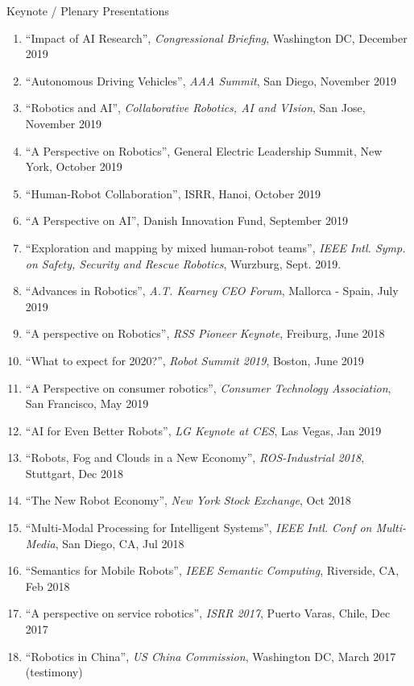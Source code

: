 \documentclass{article}
\begin{document}
\begin{cv}
\begin{cvlist}{Keynote / Plenary Presentations}
\item
  \begin{enumerate}
  \item ``Impact of AI Research'', {\em Congressional Briefing}, Washington DC, December 2019
  \item ``Autonomous Driving Vehicles'', {\em AAA Summit}, San Diego, November 2019
  \item ``Robotics and AI'', {\em Collaborative Robotics, AI and VIsion}, San Jose, November 2019
  \item ``A Perspective on Robotics'', General Electric Leadership Summit, New York, October 2019
  \item ``Human-Robot Collaboration'', ISRR, Hanoi, October 2019
  \item ``A Perspective on AI'', Danish Innovation Fund, September 2019
  \item ``Exploration and mapping by mixed human-robot teams'', {\em IEEE Intl. Symp. on Safety, Security and Rescue Robotics},
      Wurzburg, Sept. 2019. 
  \item  ``Advances in Robotics'', {\em A.T. Kearney CEO Forum}, Mallorca - Spain, July 2019
  \item ``A perspective on Robotics'', {\em RSS Pioneer Keynote}, Freiburg, June 2018
  \item ``What to expect for 2020?'', {\em Robot Summit 2019}, Boston, June 2019
  \item ``A Perspective on consumer robotics'', {\em Consumer Technology Association}, San Francisco, May 2019
  \item ``AI for Even Better Robots'', {\em LG Keynote at CES}, Las Vegas, Jan 2019
  \item ``Robots, Fog and Clouds in a New Economy'', {\em ROS-Industrial 2018}, Stuttgart, Dec 2018
  \item ``The New Robot Economy'', {\em New York Stock Exchange}, Oct 2018
  \item ``Multi-Modal Processing for Intelligent Systems'', {\em IEEE Intl. Conf on Multi-Media}, San Diego, CA, Jul 2018
  \item ``Semantics for Mobile Robots'', {\em IEEE Semantic Computing}, Riverside, CA, Feb 2018
  \item ``A perspective on service robotics'', {\em ISRR 2017}, Puerto Varas, Chile, Dec 2017
  \item ``Robotics in China'', {\em US China Commission}, Washington DC, March 2017 (testimony)

\end{enumerate}
\end{cvlist}
\end{cv}
\end{document}
